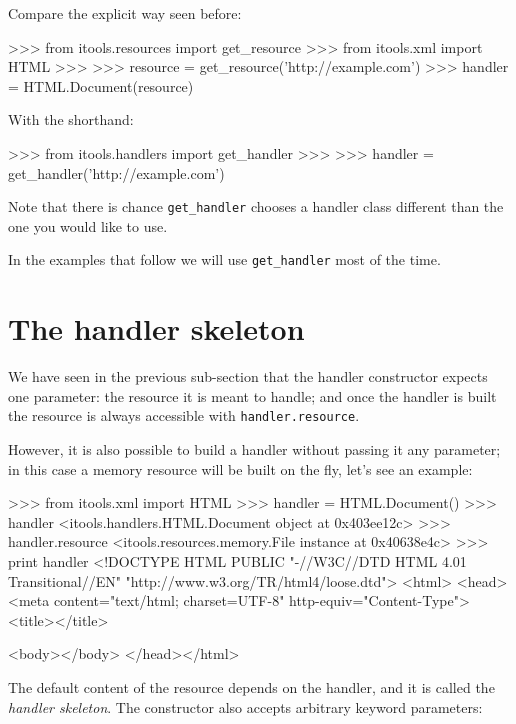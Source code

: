 Compare the explicit way seen before:

\begin{code}
    >>> from itools.resources import get_resource
    >>> from itools.xml import HTML
    >>>
    >>> resource = get_resource('http://example.com')
    >>> handler = HTML.Document(resource)
\end{code}

With the shorthand:

\begin{code}
    >>> from itools.handlers import get_handler
    >>>
    >>> handler = get_handler('http://example.com')
\end{code}

Note that there is chance {\tt get\_handler} chooses a handler class
different than the one you would like to use.

In the examples that follow we will use {\tt get\_handler} most of the
time.


\section{The handler skeleton}

We have seen in the previous sub-section that the handler constructor expects
one parameter: the resource it is meant to handle; and once the handler is
built the resource is always accessible with {\tt handler.resource}.

However, it is also possible to build a handler without passing it any
parameter; in this case a memory resource will be built on the fly, let's
see an example:

\begin{code}
    >>> from itools.xml import HTML
    >>> handler = HTML.Document()
    >>> handler
    <itools.handlers.HTML.Document object at 0x403ee12c>
    >>> handler.resource
    <itools.resources.memory.File instance at 0x40638e4c>
    >>> print handler
    <!DOCTYPE HTML PUBLIC "-//W3C//DTD HTML 4.01 Transitional//EN"
      "http://www.w3.org/TR/html4/loose.dtd">
    <html>
      <head>
        <meta content="text/html; charset=UTF-8" http-equiv="Content-Type">
        <title></title>
      
      <body></body>
    </head></html>
\end{code}

The default content of the resource depends on the handler, and it is called
the {\em handler skeleton}. The constructor also accepts arbitrary keyword
parameters:

